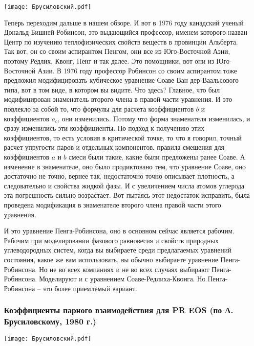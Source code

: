 \documentclass[main.tex]{subfiles}
\begin{document}
\begin{center}
\texttt{[image: Брусиловский.pdf]}
\end{center}

Теперь переходим дальше в нашем обзоре.
И вот в 1976 году канадский ученый Дональд Бишней-Робинсон, это выдающийся профессор, именем которого назван Центр по изучению теплофизических свойств веществ в провинции Альберта.
Так вот, он со своим аспирантом Пенгом, они все из Юго-Восточной Азии, поэтому Редлих, Квонг, Пенг и так далее.
Это помощники, вот они из Юго-Восточной Азии.
В 1976 году профессор Робинсон со своим аспирантом тоже предложил модифицировать кубическое уравнение Соаве Ван-дер-Ваальсового типа, вот в том виде, в котором вы видите.
Что здесь?
Главное, что был модифицирован знаменатель второго члена в правой части уравнения.
И это повлекло за собой то, что формулы для расчета коэффициентов $b$ и коэффициентов $a_c$, они изменились.
Потому что форма знаменателя изменилась, и сразу изменились эти коэффициенты.
Но подход к получению этих коэффициентов, то есть условия в критической точке, то что я говорил, точный расчет упругости паров и отдельных компонентов, правила смешения для коэффициентов $a$ и $b$ смеси были такие, какие были предложены ранее Соаве.
А изменение в знаменателе, оно было продиктовано тем, что уравнение Соаве, оно достаточно не точно, вернее так, недостаточно точно описывает плотность, а следовательно и свойства жидкой фазы.
И с увеличением числа атомов углерода эта погрешность сильно возрастает.
Вот пытаясь этот недостаток исправить, была проведена модификация в знаменателе второго члена правой части этого уравнения.

И это уравнение Пенга-Робинсона, оно в основном сейчас является рабочим.
Рабочим при моделировании фазового равновесия и свойств природных углеводородных систем, когда вы выбираете среди предлагаемых уравнений состояния, какое же вам использовать, вы обычно выбираете уравнение Пенга-Робинсона.
Но не во всех компаниях и не во всех случаях выбирают Пенга-Робинсона.
Моделируют и с уравнением Соаве-Редлиха-Квонга.
Но Пенга-Робинсона -- это более приемлемый вариант.

\subsubsection{Коэффициенты парного взаимодействия для PR EOS (по А. Брусиловскому, 1980 г.)}

\begin{center}
\texttt{[image: Брусиловский.pdf]}
\end{center}
\end{document}
